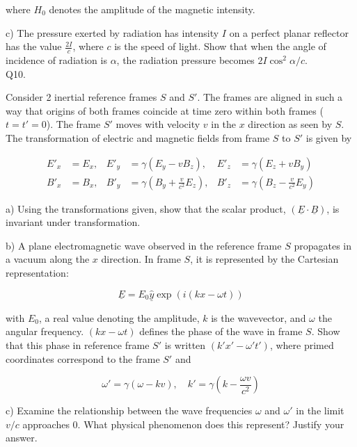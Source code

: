 \documentclass[a4paper,11pt]{article}
\begin{document}
where \( H_{0} \) denotes the amplitude of the magnetic intensity.

c) The pressure exerted by radiation has intensity \( I \) on a perfect planar reflector has the value \( \frac{2I}{c} \), where \( c \) is the speed of light. Show that when the angle of incidence of radiation is \( \alpha \), the radiation pressure becomes \( 2I\cos^{2}{\alpha}/{c} \).\\

\noindent Q10. 

\noindent Consider 2 inertial reference frames \( S \) and \( S' \). The frames are aligned in such a way that origins of both frames coincide at time zero within both frames (\( t = t' = 0 \)). The frame \( S' \) moves with velocity \( v \) in the \( x \) direction as seen by \( S \). The transformation of electric and magnetic fields from frame \( S \) to \( S' \) is given by 

\[
\begin{aligned}
E'_{x} &= E_{x}, & E'_{y} &= \gamma(E_{y} - vB_{z}), & E'_{z} &= \gamma(E_{z} + vB_{y}) \\
B'_{x} &= B_{x}, & B'_{y} &= \gamma(B_{y} + \frac{v}{c^{2}} E_{z}), & B'_{z} &= \gamma(B_{z} - \frac{v}{c^{2}} E_{y})
\end{aligned}
\]

\medskip

\noindent a) Using the transformations given, show that the scalar product, \( (\underline{E} \cdot \underline{B}) \), is invariant under transformation.

\medskip

\noindent b) A plane electromagnetic wave observed in the reference frame \( S \) propagates in a vacuum along the \( x \) direction. In frame \( S \), it is represented by the Cartesian representation: 

\[ \underline{E} = E_{0} \hat{\underline{y}} \exp(i(kx - \omega t)) \]

with \( E_{0} \), a real value denoting the amplitude, \( k \) is the wavevector, and \( \omega \) the angular frequency. \( (kx - \omega t) \) defines the phase of the wave in frame \( S \). Show that this phase in reference frame \( S' \) is written \( (k'x' - \omega' t') \), where primed coordinates correspond to the frame \( S' \) and

\[ \omega' = \gamma(\omega - kv), \quad k' = \gamma(k - \frac{\omega v}{c^{2}}) \]

\medskip

\noindent c) Examine the relationship between the wave frequencies \( \omega \) and \( \omega' \) in the limit \( v/c \) approaches \( 0 \). What physical phenomenon does this represent? Justify your answer.
\end{document}
